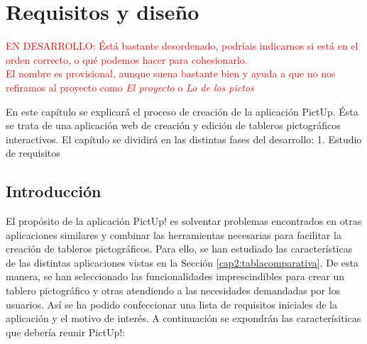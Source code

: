 \chapter{Requisitos y diseño}
\label{cap:introduccion}


\textcolor{red}{EN DESARROLLO: Éstá bastante desordenado, podríais indicarnos si está en el orden correcto, o qué podemos hacer para cohesionarlo. \\ El nombre es provisional, aunque suena bastante bien y ayuda a que no nos refiramos al proyecto como \textit{El proyecto} o \textit{Lo de los pictos}}



\begin{resumen}

	
	
	En este capítulo se explicará el proceso de creación de la aplicación PictUp. Ésta se trata de una aplicación web de creación y edición de tableros pictográficos interactivos. El capítulo se dividirá en las distintas fases del desarrollo: 1. Estudio de requisitos 
	
\end{resumen}

\label{cap1:sec:Motivacion}


\section{Introducción}

El propósito de la aplicación PictUp! es solventar problemas encontrados en otras aplicaciones similares y combinar las herramientas necesarias para facilitar la creación de tableros pictográficos. Para ello, se han estudiado las características de las distintas aplicaciones vistas en la Sección \ref{cap2:tablacomparativa}. De esta manera, se han seleccionado las funcionalidades imprescindibles para crear un tablero pictográfico y otras atendiendo a las necesidades demandadas por los usuarios. Así se ha podido confeccionar una lista de requisitos iniciales de la aplicación y el motivo de interés. A continuación se expondrán las caracterísiticas que debería reunir PictUp!: 


